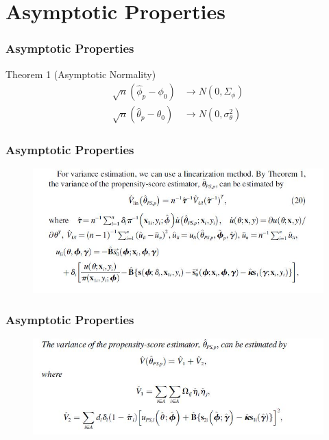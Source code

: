 \documentclass{beamer}
\newcommand{\bra}[1]{\left(#1\right)}
\newcommand{\al}[1]{\begin{align*}#1\end{align*}}
\begin{document}
\section{Asymptotic Properties}

\begin{frame}
\frametitle{Asymptotic Properties}
\begin{block}{Theorem 1 (Asymptotic Normality)}
\al{\sqrt{n}\bra{\hat\phi_p - \phi_0} &\rightarrow N\bra{0, \Sigma_\phi}\\
	\sqrt{n}\bra{\hat\theta_p - \theta_0} &\rightarrow N\bra{0, \sigma^2_\theta}}
\vspace{2mm}
\end{block}
\end{frame}

\begin{frame}
\frametitle{Asymptotic Properties}
\begin{figure}
\includegraphics[width=1\linewidth]{linvar.jpg}
\end{figure}
\end{frame}

\begin{frame}
\frametitle{Asymptotic Properties}
\begin{figure}
\includegraphics[width=1\linewidth]{var.jpg}
\end{figure}
\end{frame}

\end{document}
